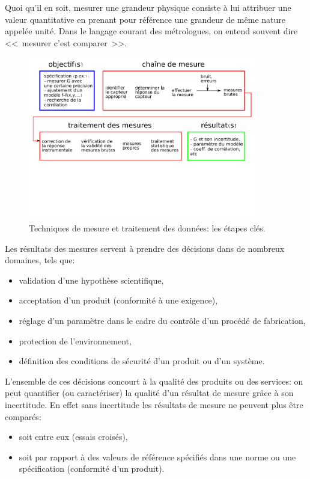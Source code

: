 Quoi qu'il en soit, mesurer une grandeur physique consiste à lui attribuer une valeur quantitative en prenant pour référence une grandeur de même nature appelée unité. Dans le langage courant des métrologues, on entend souvent dire \textless\textless\ mesurer c'est comparer\ \textgreater\textgreater.

\begin{figure}[ht]
   \centering
   \includegraphics[width=0.9\textwidth]{assets/figures/flowChartTechMes.pdf}
   \caption{Techniques de mesure et traitement des données: les étapes clés.}
   \label{fig:flowchartTechMes}
\end{figure}
Les résultats des mesures servent à prendre des décisions dans de nombreux domaines, tels que:

\begin{itemize}
   \item validation d'une hypothèse scientifique,
   \item acceptation d'un produit (conformité à une exigence),
   \item réglage d'un paramètre dans le cadre du contrôle d'un procédé de fabrication,
   \item protection de l'environnement,
   \item définition des conditions de sécurité d'un produit ou d'un système.
\end{itemize}

L'ensemble de ces décisions concourt à la qualité des produits ou des services: on peut quantifier (ou caractériser) la qualité d'un résultat de mesure grâce à son incertitude.
En effet sans incertitude les résultats de mesure ne peuvent plus être comparés:

\begin{itemize}
   \item soit entre eux (essais croisés),
   \item soit par rapport à des valeurs de référence spécifiés dans une norme ou une spécification (conformité d'un produit).
\end{itemize}

